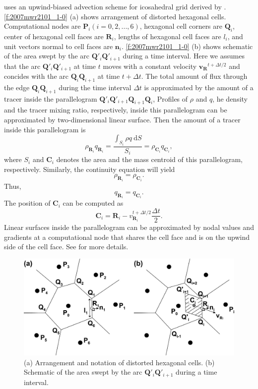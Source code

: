 \NICAM uses an upwind-biased advection scheme for icosahedral grid
derived by \cite{Miura:2007bs}.
%
\autoref{f:2007mwr2101_1-0} (a) shows arrangement of distorted hexagonal
cells. Computational nodes are $\bm{P}_i(i=0,2,...,6)$, hexagonal cell
corners are $\bm{Q}_i$, center of hexagonal cell faces are $\bm{R}_i$,
lengths of hexagonal cell faces are $l_i$, and unit vectors normal to
cell faces are $\bm{n}_i$.
%
\autoref{f:2007mwr2101_1-0} (b) shows schematic of the area swept by the
arc $\bm{Q}'_i\bm{Q}'_{i+1}$ during a time interval.
%
Here we assumes that the arc $\bm{Q}'_i\bm{Q}'_{i+1}$ at time $t$
moves with a constant velocity $\bm{v_R}^{t+\Delta t/2}$
and concides with the arc $\bm{Q}_i\bm{Q}_{i+1}$ at time $t+\Delta t$.
%
The total amount of flux through the edge $\bm{Q}_i\bm{Q}_{i+1}$
during the time interval $\Delta t$ is approximated by the amount of a
tracer inside the parallelogram
$\bm{Q}'_i\bm{Q}'_{i+1}\bm{Q}_{i+1}\bm{Q}_i$,
%
Profiles of $\rho$ and $q$, he density and the
tracer mixing ratio, respectively, inside this parallelogram can be
approximated by two-dimensional linear surface.
%
Then the amount of a tracer inside this parallelogram is
%
\begin{equation}
\rho_{\bm{R}_i} q_{\bm{R}_i} 
 = \frac{\int_{S_i} \rho q \ \mathrm{d}S}
         {S_i}  
 = \rho_{\bm{C}_i} q_{\bm{C}_i},
\end{equation}
%
where $S_i$ and 
$\bm{C}_i$ denotes the area and the mass centroid of this parallelogram, respectively.
%
Similarly, the continuity equation will yield
%
\begin{equation}
 \rho_{\bm{R}_i} = \rho_{\bm{C}_i}.
\end{equation}
%
Thus,
%
\begin{equation}
 q_{\bm{R}_i} = q_{\bm{C}_i}.
\end{equation}
%
The position of $\bm{C}_i$ can be computed as
%
\begin{equation}
\bm{C}_i = \bm{R}_i - v_{\bm{R}_i}^{t+\Delta t/2} \frac{\Delta t}{2}.
\end{equation}
%
Linear surfaces inside the parallelogram can be approximated by nodal
values and gradients at a computational node that shares the cell face
and is on the upwind side of the cell face.
%
See \cite{Miura:2007bs} for more details.

\begin{figure}[htbp]
\centering
\includegraphics[scale=.3]{figs/2007mwr2101_1-0.png} 
 \caption{%
(a) Arrangement and notation of distorted hexagonal cells.%
(b) Schematic of the area swept by the arc $\bm{Q}'_i \bm{Q}'_{i+1}$ during a time interval.%
}\label{f:2007mwr2101_1-0}
\end{figure}


